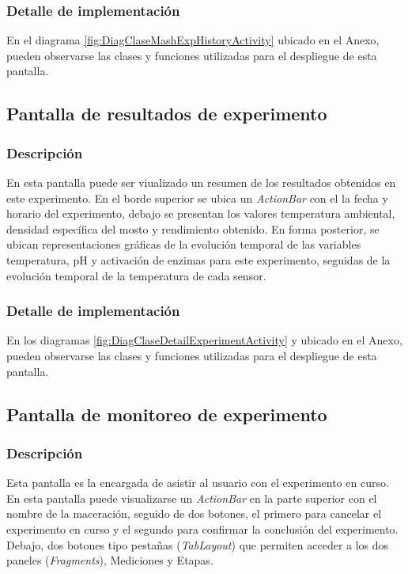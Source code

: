             \subsubsection{Detalle de implementación}
            En el diagrama \ref{fig:DiagClaseMashExpHistoryActivity} ubicado en el Anexo, pueden observarse las clases y funciones utilizadas para el despliegue de esta pantalla.
            
        
        \subsection{Pantalla de resultados de experimento}
        \label{DescripPantallaResultadosExperimento}
            \subsubsection{Descripción}
            En esta pantalla puede ser viualizado un resumen de los resultados obtenidos en este experimento.
            En el borde superior se ubica un \textit{ActionBar} con el la fecha y horario del experimento, debajo se presentan los valores temperatura ambiental, densidad específica del mosto y rendimiento obtenido. En forma posterior, se ubican representaciones gráficas de la evolución temporal de las variables temperatura, pH y activación de enzimas para este experimento, seguidas de la evolución temporal de la temperatura de cada sensor.
            
            \subsubsection{Detalle de implementación}
            En los diagramas \ref{fig:DiagClaseDetailExperimentActivity} y  ubicado en el Anexo, pueden observarse las clases y funciones utilizadas para el despliegue de esta pantalla.
            
            
        \subsection{Pantalla de monitoreo de experimento}
        \label{DescripMonitoreoExperimento}
            \subsubsection{Descripción}
            Esta pantalla es la encargada de asistir al usuario con el experimento en curso.
            En esta pantalla puede visualizarse un \textit{ActionBar} en la parte superior con el nombre de la maceración, seguido de dos botones, el primero para cancelar el experimento en curso y el segundo para confirmar la conclusión del experimento. Debajo, dos botones tipo pestañas (\textit{TabLayout}) que permiten acceder a los dos paneles (\textit{Fragments}), Mediciones y Etapas.
            
